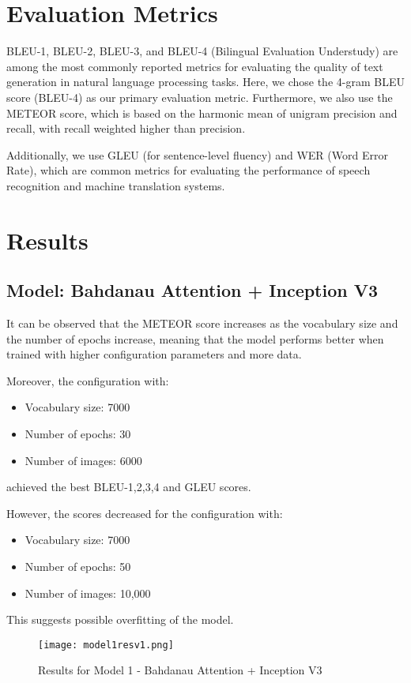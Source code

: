 \documentclass{article}
\begin{document}
\section{Evaluation Metrics}
BLEU-1, BLEU-2, BLEU-3, and BLEU-4 (Bilingual Evaluation Understudy) are among the most commonly reported metrics for evaluating the quality of text generation in natural language processing tasks. Here, we chose the 4-gram BLEU score (BLEU-4) as our primary evaluation metric. Furthermore, we also use the METEOR score, which is based on the harmonic mean of unigram precision and recall, with recall weighted higher than precision. 

Additionally, we use GLEU (for sentence-level fluency) and WER (Word Error Rate), which are common metrics for evaluating the performance of speech recognition and machine translation systems.
\section{Results}

\subsection{Model: Bahdanau Attention + Inception V3}

It can be observed that the METEOR score increases as the vocabulary size and the number of epochs increase, meaning that the model performs better when trained with higher configuration parameters and more data. 

Moreover, the configuration with:
\begin{itemize}
    \item Vocabulary size: 7000
    \item Number of epochs: 30
    \item Number of images: 6000
\end{itemize}
achieved the best BLEU-1,2,3,4 and GLEU scores. 

However, the scores decreased for the configuration with:
\begin{itemize}
    \item Vocabulary size: 7000
    \item Number of epochs: 50
    \item Number of images: 10,000
\end{itemize}
This suggests possible overfitting of the model.

\begin{figure}[htbp]
    \centering
    \texttt{[image: model1resv1.png]}
    \caption{Results for Model 1 - Bahdanau Attention + Inception V3}
    \label{fig:model1_res1}
\end{figure}
\end{document}
